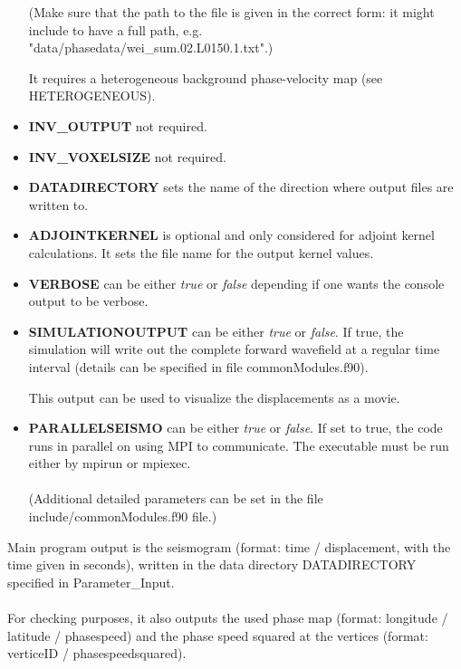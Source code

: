 \documentclass[a4paper,
                          headsepline,
                          listof=totoc,
                          toc=listof,
                          headings=small]{scrreprt} %
\begin{document}
\begin{itemize}
(Make sure that the path to the file is given in the correct form: it might include to have a full path, e.g.\\
"data/phasedata/wei\_sum.02.L0150.1.txt".)


It requires a heterogeneous background phase-velocity map
(see HETEROGENEOUS).


\item \textbf{INV\_OUTPUT}
not required.

\item \textbf{INV\_VOXELSIZE}
not required.

\item \textbf{DATADIRECTORY}
sets the name of the direction where output files are written to.

\item \textbf{ADJOINTKERNEL}
is optional and only considered for adjoint kernel calculations. It sets the file name
for the output kernel values.

\item \textbf{VERBOSE}
can be either \textit{true} or \textit{false} depending if one wants the console output to be verbose.

\item \textbf{SIMULATIONOUTPUT}
can be either \textit{true} or \textit{false}. If true, the simulation will write out the
complete forward wavefield at a regular time
interval (details can be specified in file commonModules.f90).

This output can be used to visualize the displacements as a movie.

\item \textbf{PARALLELSEISMO}
can be either \textit{true} or \textit{false}. If set to true, the code runs in parallel on using MPI
to communicate. The executable must be run either by mpirun or mpiexec.
\\
\\
(Additional detailed parameters can be set
in the file include/commonModules.f90 file.)

\end{itemize}


Main program output is the seismogram (format: time / displacement, with the
time given in seconds),
written in the data directory DATADIRECTORY specified in Parameter\_Input.
\\
\\
For checking purposes, it also outputs the used phase map
(format: longitude / latitude / phasespeed)
and the phase speed squared at the vertices
(format: verticeID / phasespeedsquared).
\end{document}
